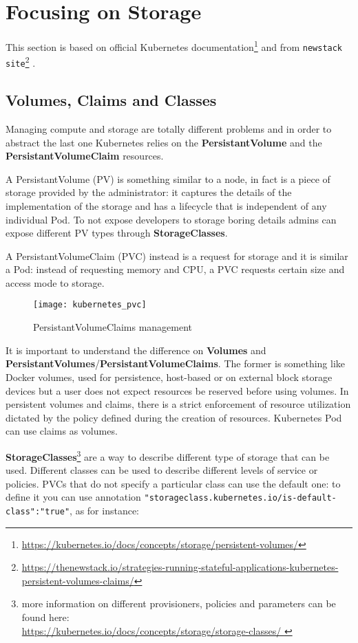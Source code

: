 \section{Focusing on Storage}
\label{focusing-on-storage}

This section is based on official Kubernetes documentation\footnote{
\url{https://kubernetes.io/docs/concepts/storage/persistent-volumes/}} and
from \texttt{newstack site}\footnote{
\sloppy
\url{https://thenewstack.io/strategies-running-stateful-applications-kubernetes-persistent-volumes-claims/}}
.

\subsection{Volumes, Claims and Classes}
\label{volumes-claims-and-classes}

Managing compute and storage are totally different problems and in order
to abstract the last one Kubernetes relies on the \textbf{PersistantVolume}
and the \textbf{PersistantVolumeClaim} resources.

A PersistantVolume (PV) is something similar to a node, in fact
is a piece of storage provided by the administrator: it captures the
details of the implementation of the storage and has a lifecycle that is
independent of any individual Pod. To not expose developers to storage
boring details admins can expose different PV types through
\textbf{StorageClasses}.

A PersistantVolumeClaim (PVC) instead is a request for storage and it is 
similar a Pod: instead of requesting memory and CPU, a PVC requests certain 
size and access mode to storage.

\begin{figure}[htbp]
\centering
\texttt{[image: kubernetes\_pvc]}
\caption{PersistantVolumeClaims management}
\end{figure}

It is important to understand the difference on \textbf{Volumes} and
\textbf{PersistantVolumes}/\textbf{PersistantVolumeClaims}. The former is
something like Docker volumes, used for persistence, host-based or on external
block storage devices but a user does not expect resources be reserved before
using volumes. In persistent volumes and claims, there is a strict enforcement
of resource utilization dictated by the policy defined during the
creation of resources. Kubernetes Pod can use claims as volumes.

\textbf{StorageClasses}\footnote{more information on different provisioners,
policies and parameters can be found here: \\\url{
https://kubernetes.io/docs/concepts/storage/storage-classes/
}} are a way to describe different type of storage
that can be used. Different classes can be used to describe different
levels of service or policies. PVCs that do not specify a particular class
can use the default one: to define it you can use annotation
\verb!"storageclass.kubernetes.io/is-default-class":"true"!, as for
instance:

